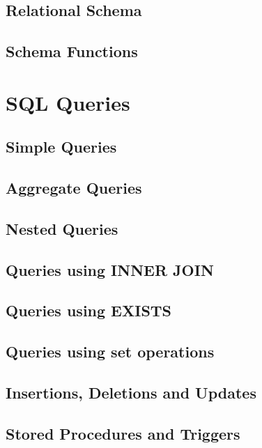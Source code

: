 \subsection{Relational Schema}

\subsection{Schema Functions}

\newpage

\section{SQL Queries}

\subsection{Simple Queries}

\subsection{Aggregate Queries}

\subsection{Nested Queries}

\subsection{Queries using INNER JOIN}

\subsection{Queries using EXISTS}

\subsection{Queries using set operations}

\subsection{Insertions, Deletions and Updates}

\subsection{Stored Procedures and Triggers}

